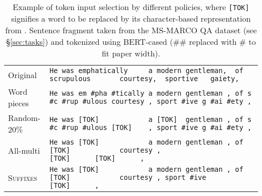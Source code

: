 \begin{table*}
    \centering
    \tiny
    \begin{tabular}{ll}
        \toprule
        {\small Original} & \texttt{He was emphatically~~~~~a modern gentleman,~~of scrupulous~~~~~~~courtesy,~~sportive~~~gaiety,} \\ %
        {\small Word pieces} & \texttt{He was em \#pha \#tically a modern gentleman , of s \#c \#rup \#ulous courtesy , sport \#ive g \#ai \#ety ,} \\
        \midrule
        {\small Random-20\%} & \texttt{He was [TOK]~~~~~~~~~~~~a [TOK]~~gentleman , of s \#c \#rup \#ulous~[TOK]~~~~, sport \#ive g \#ai \#ety ,} \\
        {\small All-multi} & \texttt{He was [TOK]~~~~~~~~~~~~a modern gentleman , of [TOK]~~~~~~~~~~~~courtesy , [TOK]~~~~~~[TOK]~~~~~~,} \\
        {\small \textsc{Suffixes}} & \texttt{He was [TOK]~~~~~~~~~~~~a modern gentleman , of [TOK]~~~~~~~~~~~~courtesy , sport \#ive [TOK]~~~~~~,} \\
        \bottomrule
    \end{tabular}
    \caption{Example of token input selection by different policies,
    where \texttt{[TOK]} signifies a word to be replaced by its character-based representation from \tok{}.
    Sentence fragment taken from the MS-MARCO QA dataset (see \S\ref{sec:tasks}) and tokenized using BERT-cased (\#\# replaced with \# to fit paper width).}
    \label{tab:policies}
\end{table*}

